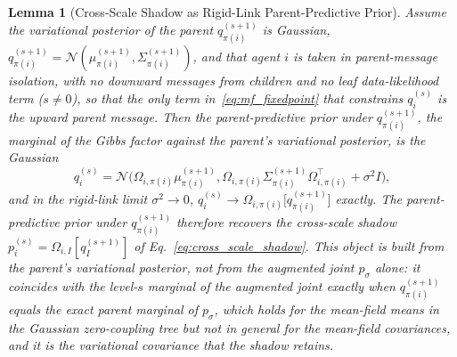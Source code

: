\documentclass[11pt]{article}
\newtheorem{lemma}{Lemma}
\begin{document}
\begin{lemma}[Cross-Scale Shadow as Rigid-Link Parent-Predictive Prior]
\label{lem:shadow_mf_optimum}
Assume the variational posterior of the parent $q_{\pi(i)}^{(s+1)}$ is Gaussian, $q_{\pi(i)}^{(s+1)} = \mathcal{N}(\mu_{\pi(i)}^{(s+1)}, \Sigma_{\pi(i)}^{(s+1)})$, and that agent $i$ is taken in parent-message isolation, with no downward messages from children and no leaf data-likelihood term ($s \neq 0$), so that the only term in~\eqref{eq:mf_fixedpoint} that constrains $q_i^{(s)}$ is the upward parent message. Then the parent-predictive prior under $q_{\pi(i)}^{(s+1)}$, the marginal of the Gibbs factor against the parent's variational posterior, is the Gaussian
\begin{equation}
q_i^{(s)}  =  \mathcal{N}\big(\Omega_{i,\pi(i)} \mu_{\pi(i)}^{(s+1)}, \Omega_{i,\pi(i)} \Sigma_{\pi(i)}^{(s+1)} \Omega_{i,\pi(i)}^\top + \sigma^2 I\big),
\label{eq:shadow_soft}
\end{equation}
and in the rigid-link limit $\sigma^2 \to 0$, $q_i^{(s)} \to \Omega_{i,\pi(i)}\big[q_{\pi(i)}^{(s+1)}\big]$ exactly. The parent-predictive prior under $q_{\pi(i)}^{(s+1)}$ therefore recovers the cross-scale shadow $p_i^{(s)} = \Omega_{i,I}[q_I^{(s+1)}]$ of Eq.~\eqref{eq:cross_scale_shadow}. This object is built from the parent's variational posterior, not from the augmented joint $p_\sigma$ alone: it coincides with the level-$s$ marginal of the augmented joint exactly when $q_{\pi(i)}^{(s+1)}$ equals the exact parent marginal of $p_\sigma$, which holds for the mean-field means in the Gaussian zero-coupling tree but not in general for the mean-field covariances, and it is the variational covariance that the shadow retains.
\end{lemma}
\end{document}
